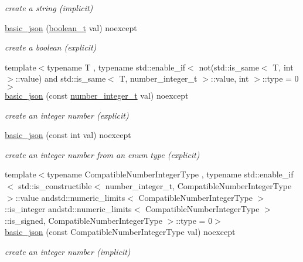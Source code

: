 \begin{DoxyCompactItemize}
\begin{DoxyCompactList}\small\item\em create a string (implicit) \end{DoxyCompactList}\item 
\hyperlink{classnlohmann_1_1basic__json_aac36af84d907b5c3e469af889661620a}{basic\-\_\-json} (\hyperlink{classnlohmann_1_1basic__json_af3bc3e83aa162d7ba4df16a949872723}{boolean\-\_\-t} val) noexcept
\begin{DoxyCompactList}\small\item\em create a boolean (explicit) \end{DoxyCompactList}\item 
{\footnotesize template$<$typename T , typename std\-::enable\-\_\-if$<$ not(std\-::is\-\_\-same$<$ T, int $>$\-::value) and std\-::is\-\_\-same$<$ T, number\-\_\-integer\-\_\-t $>$\-::value, int $>$\-::type  = 0$>$ }\\\hyperlink{classnlohmann_1_1basic__json_a0d838bc7ffca6017f51167e0a8ffd9b6}{basic\-\_\-json} (const \hyperlink{classnlohmann_1_1basic__json_ac4b10b2364f26ce47bdb9a413ff04a59}{number\-\_\-integer\-\_\-t} val) noexcept
\begin{DoxyCompactList}\small\item\em create an integer number (explicit) \end{DoxyCompactList}\item 
\hyperlink{classnlohmann_1_1basic__json_a70ae1f0747f5b7a89979512866474f1a}{basic\-\_\-json} (const int val) noexcept
\begin{DoxyCompactList}\small\item\em create an integer number from an enum type (explicit) \end{DoxyCompactList}\item 
{\footnotesize template$<$typename Compatible\-Number\-Integer\-Type , typename std\-::enable\-\_\-if$<$ std\-::is\-\_\-constructible$<$ number\-\_\-integer\-\_\-t, Compatible\-Number\-Integer\-Type $>$\-::value andstd\-::numeric\-\_\-limits$<$ Compatible\-Number\-Integer\-Type $>$\-::is\-\_\-integer andstd\-::numeric\-\_\-limits$<$ Compatible\-Number\-Integer\-Type $>$\-::is\-\_\-signed, Compatible\-Number\-Integer\-Type $>$\-::type  = 0$>$ }\\\hyperlink{classnlohmann_1_1basic__json_ad2eddc2c13ab084f067eaba65d381ad2}{basic\-\_\-json} (const Compatible\-Number\-Integer\-Type val) noexcept
\begin{DoxyCompactList}\small\item\em create an integer number (implicit) \end{DoxyCompactList}\item 

\end{DoxyCompactItemize}
